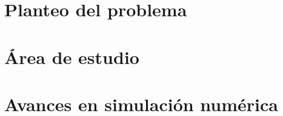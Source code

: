
\section{Planteo del problema}



\section{Área de estudio}


\section{Avances en simulación numérica}

